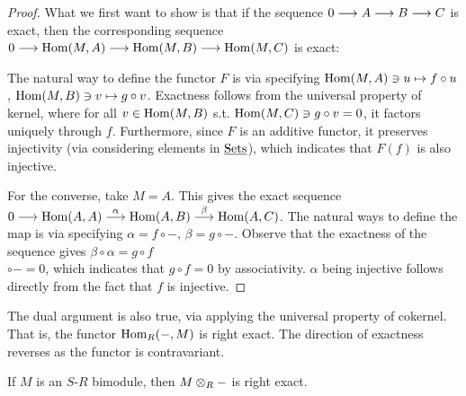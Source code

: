 \documentclass{article}
\begin{document}
\begin{proof}
    What we first want to show is that if the sequence $0 \longrightarrow A \longrightarrow B \longrightarrow C$ is exact, then the corresponding sequence $0 \longrightarrow \mathrm{Hom}(M, A) \longrightarrow \mathrm{Hom}(M, B) \longrightarrow \mathrm{Hom}(M, C)$ is exact:
    \begin{figure}[htbp]
        \centering
    \end{figure}
    The natural way to define the functor $F$ is via specifying $\mathrm{Hom}(M, A) \ni u \mapsto f \circ u$, $\mathrm{Hom}(M, B) \ni v \mapsto g \circ v$. Exactness follows from the universal property of kernel, where for all $v \in \mathrm{Hom}(M, B)$ s.t. $\mathrm{Hom}(M, C) \ni g \circ v = 0$, it factors uniquely through $f$. Furthermore, since $F$ is an additive functor, it preserves injectivity (via considering elements in $\underline{\textup{Sets}}$), which indicates that $F(f)$ is also injective.

    For the converse, take $M = A$. This gives the exact sequence $0 \longrightarrow \mathrm{Hom} (A, A) \overset{\alpha}{\longrightarrow} \mathrm{Hom}(A, B) \overset{\beta}{\longrightarrow} \mathrm{Hom}(A, C)$. The natural ways to define the map is via specifying $\alpha = f \circ -$, $\beta = g \circ -$. Observe that the exactness of the sequence gives $\beta \circ \alpha = g \circ f $ \\ $\circ - = 0$, which indicates that $g \circ f = 0$ by associativity. $\alpha$ being injective follows directly from the fact that $f$ is injective.
\end{proof}

\begin{remark}
    The dual argument is also true, via applying the universal property of cokernel. That is, the functor $\mathrm{Hom}_R(-, M)$ is right exact. The direction of exactness reverses as the functor is contravariant. 
\end{remark}

\begin{proposition}\label{prop:tensor product functor right exact}
    If $M$ is an $S$-$R$ bimodule, then $M \otimes_R -$ is right exact. 
\end{proposition}
\end{document}
